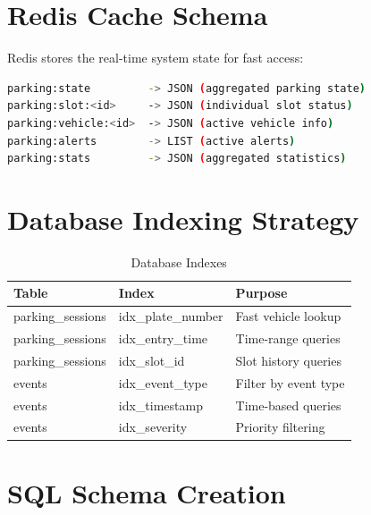 \documentclass[12pt,a4paper]{report}
\begin{document}
\section{Redis Cache Schema}

Redis stores the real-time system state for fast access:

\begin{lstlisting}[language=bash, caption=Redis Key Structure]
parking:state         -> JSON (aggregated parking state)
parking:slot:<id>     -> JSON (individual slot status)
parking:vehicle:<id>  -> JSON (active vehicle info)
parking:alerts        -> LIST (active alerts)
parking:stats         -> JSON (aggregated statistics)
\end{lstlisting}

\section{Database Indexing Strategy}

\begin{table}[H]
\centering
\caption{Database Indexes}
\begin{tabular}{|l|l|l|}
\hline
\textbf{Table} & \textbf{Index} & \textbf{Purpose} \\
\hline
parking\_sessions & idx\_plate\_number & Fast vehicle lookup \\
\hline
parking\_sessions & idx\_entry\_time & Time-range queries \\
\hline
parking\_sessions & idx\_slot\_id & Slot history queries \\
\hline
events & idx\_event\_type & Filter by event type \\
\hline
events & idx\_timestamp & Time-based queries \\
\hline
events & idx\_severity & Priority filtering \\
\hline
\end{tabular}
\end{table}

\section{SQL Schema Creation}
\end{document}
